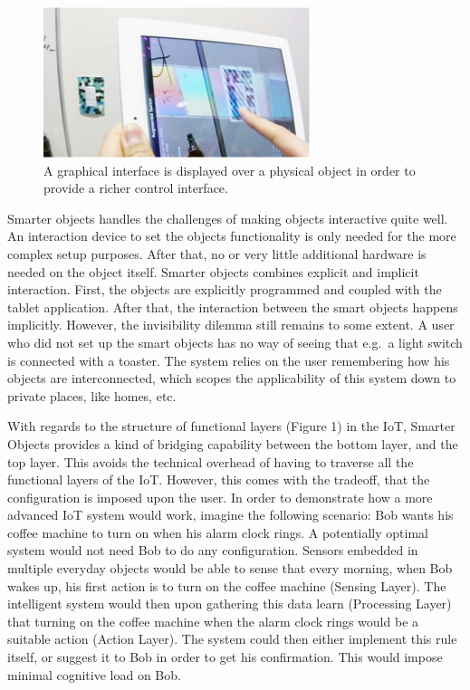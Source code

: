 \begin{figure}[!t]
	\centering
	\includegraphics[width=0.9\columnwidth]{Images/smarterObjectsGUI}
	\caption{A graphical interface is displayed over a physical object in order to provide a richer control interface.}
	\label{fig:smarterObjectsGUI}
\end{figure}

Smarter objects handles the challenges of making objects interactive quite well. 
An interaction device to set the objects functionality is only needed for the more complex setup purposes. 
After that, no or very little additional hardware is needed on the object itself.
Smarter objects combines explicit and implicit interaction.
First, the objects are explicitly programmed and coupled with the tablet application.
After that, the interaction between the smart objects happens implicitly. 
However, the invisibility dilemma still remains to some extent.
A user who did not set up the smart objects has no way of seeing that e.g.\ a light switch is connected with a toaster.
The system relies on the user remembering how his objects are interconnected, which scopes the applicability of this system down to private places, like homes, etc.

With regards to the structure of functional layers (Figure 1) in the IoT, Smarter Objects provides a kind of bridging capability between the bottom layer, and the top layer.
This avoids the technical overhead of having to traverse all the functional layers of the IoT.
However, this comes with the tradeoff, that the configuration is imposed upon the user. 
In order to demonstrate how a more advanced IoT system would work, imagine the following scenario: Bob wants his coffee machine to turn on when his alarm clock rings.
A potentially optimal system would not need Bob to do any configuration.
Sensors embedded in multiple everyday objects would be able to sense that every morning, when Bob wakes up, his first action is to turn on the coffee machine (Sensing Layer).
The intelligent system would then upon gathering this data learn (Processing Layer) that turning on the coffee machine when the alarm clock rings would be a suitable action (Action Layer).
The system could then either implement this rule itself, or suggest it to Bob in order to get his confirmation.
This would impose minimal cognitive load on Bob. 

